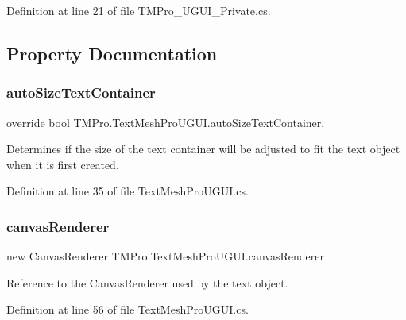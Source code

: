 Definition at line 21 of file T\+M\+Pro\+\_\+\+U\+G\+U\+I\+\_\+\+Private.\+cs.



\subsection{Property Documentation}
\mbox{\label{class_t_m_pro_1_1_text_mesh_pro_u_g_u_i_a72ed4179b22cde1a87b5c6282d6dfd4c}} 
\subsubsection{\texorpdfstring{autoSizeTextContainer}{autoSizeTextContainer}}
{\footnotesize\ttfamily override bool T\+M\+Pro.\+Text\+Mesh\+Pro\+U\+G\+U\+I.\+auto\+Size\+Text\+Container\hspace{0.3cm}{\ttfamily [get]}, {\ttfamily [set]}}



Determines if the size of the text container will be adjusted to fit the text object when it is first created. 



Definition at line 35 of file Text\+Mesh\+Pro\+U\+G\+U\+I.\+cs.

\mbox{\label{class_t_m_pro_1_1_text_mesh_pro_u_g_u_i_a8410ad5e8c69c64d5e1df5a722390526}} 
\subsubsection{\texorpdfstring{canvasRenderer}{canvasRenderer}}
{\footnotesize\ttfamily new Canvas\+Renderer T\+M\+Pro.\+Text\+Mesh\+Pro\+U\+G\+U\+I.\+canvas\+Renderer\hspace{0.3cm}{\ttfamily [get]}}



Reference to the Canvas\+Renderer used by the text object. 



Definition at line 56 of file Text\+Mesh\+Pro\+U\+G\+U\+I.\+cs.

